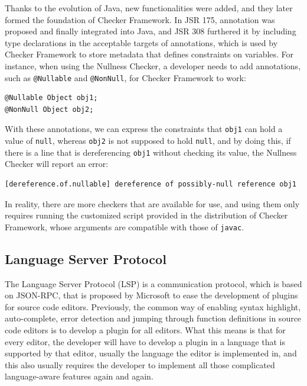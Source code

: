 \documentclass{article}
\begin{document}
Thanks to the evolution of Java, new functionalities were added, and they later formed the foundation of Checker Framework. In JSR 175\cite{jsr175}, annotation was proposed and finally integrated into Java, and JSR 308\cite{jsr308} furthered it by including type declarations in the acceptable targets of annotations, which is used by Checker Framework to store metadata that defines constraints on variables. For instance, when using the Nullness Checker, a developer needs to add annotations, such as \verb|@Nullable| and \verb|@NonNull|, for Checker Framework to work:

\begin{lstlisting}
@Nullable Object obj1;
@NonNull Object obj2;    
\end{lstlisting}

With these annotations, we can express the constraints that \verb|obj1| can hold a value of \verb|null|, whereas \verb|obj2| is not supposed to hold \verb|null|, and by doing this, if there is a line that is dereferencing \verb|obj1| without checking its value, the Nullness Checker will report an error:

\begin{lstlisting}
[dereference.of.nullable] dereference of possibly-null reference obj1
\end{lstlisting}

In reality, there are more checkers that are available for use, and using them only requires running the customized script provided in the distribution of Checker Framework, whose arguments are compatible with those of \verb|javac|.

\subsection{Language Server Protocol}

The Language Server Protocol (LSP) is a communication protocol, which is based on JSON-RPC, that is proposed by Microsoft to ease the development of plugins for source code editors. Previously, the common way of enabling syntax highlight, auto-complete, error detection and jumping through function definitions in source code editors is to develop a plugin for all editors. What this means is that for every editor, the developer will have to develop a plugin in a language that is supported by that editor, usually the language the editor is implemented in, and this also usually requires the developer to implement all those complicated language-aware features again and again.
\end{document}
